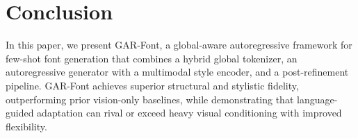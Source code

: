 \vspace{-2mm}
\section{Conclusion}
\vspace{-2mm}
In this paper, we present GAR-Font, a global-aware autoregressive framework for few-shot font generation that combines a hybrid global tokenizer, an autoregressive generator with a multimodal style encoder, and a post-refinement pipeline. GAR-Font achieves superior structural and stylistic fidelity, outperforming prior vision-only baselines, while demonstrating that language-guided adaptation can rival or exceed heavy visual conditioning with improved flexibility.

